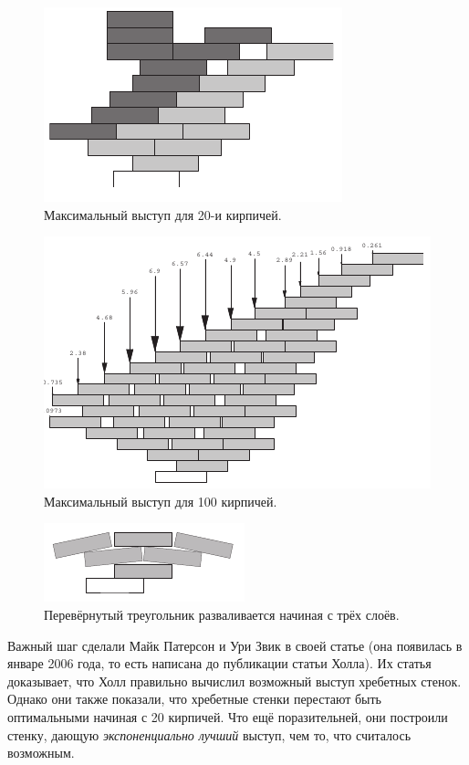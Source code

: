 \begin{figure}[htb!]
\centering
\includegraphics[scale=1]{pics/kirpich3}
\caption{Максимальный выступ для 20-и кирпичей.}
\label{pic:kirpich3}
\end{figure}

\begin{figure}[htb!]
\centering
\includegraphics[scale=1]{pics/kirpich4}
\caption{Максимальный выступ для 100 кирпичей.}
\label{pic:kirpich4}
\end{figure}

\begin{figure}[htb!]
\centering
\includegraphics[scale=1]{pics/kirpich5}
\caption{Перевёрнутый треугольник разваливается начиная с трёх слоёв.}
\label{pic:kirpich5}
\end{figure}

Важный шаг сделали Майк Патерсон и Ури Звик в своей статье \cite{47} (она появилась в январе 2006 года, то есть написана до публикации статьи Холла).
Их статья доказывает, что Холл правильно вычислил возможный выступ хребетных стенок.
Однако они также показали, что хребетные стенки перестают быть оптимальными начиная с 20 кирпичей.
Что ещё поразительней, они построили стенку, дающую \emph{экспоненциально лучший} выступ, чем то, что считалось возможным.

